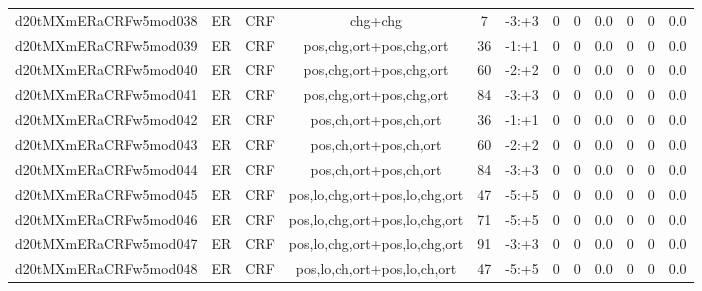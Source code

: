 \documentclass[a4paper]{article}
\begin{document}
\begin{landscape}
\begin{center}
\begin{tabular}{ |c|c|c|c|c|c|c|c|c|c|c|c|}
 
 	
 	\small{ d20tMXmERaCRFw5mod038 } & ER & CRF & chg+chg  &  7 &  -3:+3  &  0 & 0 & 0.0  &  0 & 0 & 0.0 \\
 	

 
 	
 	\small{ d20tMXmERaCRFw5mod039 } & ER & CRF & pos,chg,ort+pos,chg,ort  &  36 &  -1:+1  &  0 & 0 & 0.0  &  0 & 0 & 0.0 \\
 	

 
 	
 	\small{ d20tMXmERaCRFw5mod040 } & ER & CRF & pos,chg,ort+pos,chg,ort  &  60 &  -2:+2  &  0 & 0 & 0.0  &  0 & 0 & 0.0 \\
 	

 
 	
 	\small{ d20tMXmERaCRFw5mod041 } & ER & CRF & pos,chg,ort+pos,chg,ort  &  84 &  -3:+3  &  0 & 0 & 0.0  &  0 & 0 & 0.0 \\
 	

 
 	
 	\small{ d20tMXmERaCRFw5mod042 } & ER & CRF & pos,ch,ort+pos,ch,ort  &  36 &  -1:+1  &  0 & 0 & 0.0  &  0 & 0 & 0.0 \\
 	

 
 	
 	\small{ d20tMXmERaCRFw5mod043 } & ER & CRF & pos,ch,ort+pos,ch,ort  &  60 &  -2:+2  &  0 & 0 & 0.0  &  0 & 0 & 0.0 \\
 	

 
 	
 	\small{ d20tMXmERaCRFw5mod044 } & ER & CRF & pos,ch,ort+pos,ch,ort  &  84 &  -3:+3  &  0 & 0 & 0.0  &  0 & 0 & 0.0 \\
 	

 
 	
 	\small{ d20tMXmERaCRFw5mod045 } & ER & CRF & pos,lo,chg,ort+pos,lo,chg,ort  &  47 &  -5:+5  &  0 & 0 & 0.0  &  0 & 0 & 0.0 \\
 	

 
 	
 	\small{ d20tMXmERaCRFw5mod046 } & ER & CRF & pos,lo,chg,ort+pos,lo,chg,ort  &  71 &  -5:+5  &  0 & 0 & 0.0  &  0 & 0 & 0.0 \\
 	

 
 	
 	\small{ d20tMXmERaCRFw5mod047 } & ER & CRF & pos,lo,chg,ort+pos,lo,chg,ort  &  91 &  -3:+3  &  0 & 0 & 0.0  &  0 & 0 & 0.0 \\
 	

 
 	
 	\small{ d20tMXmERaCRFw5mod048 } & ER & CRF & pos,lo,ch,ort+pos,lo,ch,ort  &  47 &  -5:+5  &  0 & 0 & 0.0  &  0 & 0 & 0.0 \\
 	


\end{tabular}
\end{center}
\end{landscape}
\end{document}
